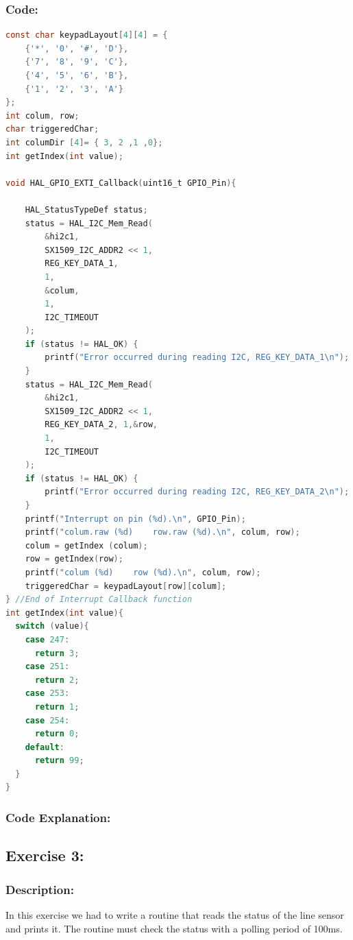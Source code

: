 \documentclass[english]{article}
\begin{document}
\subsubsection{Code:}
\begin{lstlisting}[language=C, caption={Pressed Keypad Button}, label={lst:label} ]
const char keypadLayout[4][4] = {
    {'*', '0', '#', 'D'},
    {'7', '8', '9', 'C'},
    {'4', '5', '6', 'B'},
    {'1', '2', '3', 'A'}
};
int colum, row;
char triggeredChar;
int columDir [4]= { 3, 2 ,1 ,0};
int getIndex(int value);

void HAL_GPIO_EXTI_Callback(uint16_t GPIO_Pin){

    HAL_StatusTypeDef status;
    status = HAL_I2C_Mem_Read(
        &hi2c1,
        SX1509_I2C_ADDR2 << 1,
        REG_KEY_DATA_1,
        1,
        &colum,
        1,
        I2C_TIMEOUT
    );
    if (status != HAL_OK) {
        printf("Error occurred during reading I2C, REG_KEY_DATA_1\n");
    }
    status = HAL_I2C_Mem_Read(
        &hi2c1,
        SX1509_I2C_ADDR2 << 1,
        REG_KEY_DATA_2, 1,&row,
        1, 
        I2C_TIMEOUT
    );
    if (status != HAL_OK) {
        printf("Error occurred during reading I2C, REG_KEY_DATA_2\n");
    }
    printf("Interrupt on pin (%d).\n", GPIO_Pin);
    printf("colum.raw (%d)    row.raw (%d).\n", colum, row);
    colum = getIndex (colum);
    row = getIndex(row);
    printf("colum (%d)    row (%d).\n", colum, row);
    triggeredChar = keypadLayout[row][colum];
} //End of Interrupt Callback function
int getIndex(int value){
  switch (value){
    case 247:
      return 3;
    case 251:
      return 2;
    case 253:
      return 1;
    case 254:
      return 0;
    default:
      return 99;
  }
}
\end{lstlisting}

\subsubsection{Code Explanation:}
\newpage
\subsection{Exercise 3:}
\subsubsection{Description:}
In this exercise we had to write a routine that reads the status of the line sensor and prints it. The routine must check the status with a polling period of 100ms.
\end{document}
